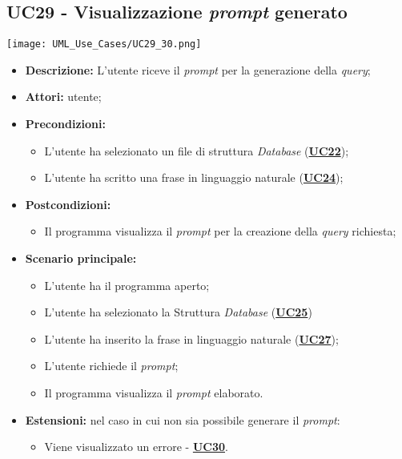 \subsection{UC29 - Visualizzazione \textit{prompt} generato}
\label{sec:UC29}
\texttt{[image: UML\_Use\_Cases/UC29\_30.png]}
\begin{itemize}
	\item \textbf{Descrizione:} L’utente riceve il \textit{prompt} per la generazione della \textit{query};
	\item \textbf{Attori:} utente;
	\item \textbf{Precondizioni:} 
	\begin{itemize}
		\item L’utente ha selezionato un file di struttura \textit{Database} (\hyperref[sec:UC25]{\textbf{UC22}});
		\item L’utente ha scritto una frase in linguaggio naturale (\hyperref[sec:UC27]{\textbf{UC24}});
	\end{itemize}
	\item \textbf{Postcondizioni:} 
	\begin{itemize}
		\item Il programma visualizza il \textit{prompt} per la creazione della \textit{query} richiesta;
	\end{itemize}
	\item \textbf{Scenario principale:} 
	\begin{itemize}
		\item L’utente ha il programma aperto;
		\item L’utente ha selezionato la Struttura \textit{Database} (\hyperref[sec:UC25]{\textbf{UC25}})
		\item L'utente ha inserito la frase in linguaggio naturale (\hyperref[sec:UC27]{\textbf{UC27}});
		\item L’utente richiede il \textit{prompt};
		\item Il programma visualizza il \textit{prompt} elaborato.
	\end{itemize}
	\item \textbf{Estensioni:} nel caso in cui non sia possibile generare il \textit{prompt}:
	\begin{itemize}
		\item Viene visualizzato un errore - \hyperref[sec:UC30]{\textbf{UC30}}.
	\end{itemize}
\end{itemize}

